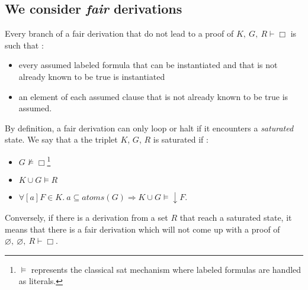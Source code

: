 \documentclass[a4paper,10pt]{report}
\newcommand{\atoms}{\mathit{atoms}}
\newcommand{\gen}{\vdash}
\begin{document}
\subsection{We consider \emph{fair} derivations}
Every branch of a fair derivation that do not lead to a proof of $K,\ G,\ R\gen\Box$ is such that :
\begin{itemize}
 \item every assumed labeled formula that can be instantiated and that is
not already known to be true is instantiated
 \item an element of each assumed clause that is not already known to be true is assumed.
\end{itemize}
By definition, a fair derivation can only loop or halt if it encounters a \emph{saturated} state.
We say that a the triplet $K$, $G$, $R$ is saturated if :
\begin{itemize}
 \item $G\nvDash\Box$\footnote{$\vDash$ represents the classical sat mechanism where labeled
formulas are handled as literals.}
 \item $K\cup G\vDash R$
 \item $\forall [a]F\in K.\ a\subseteq\atoms(G)\Rightarrow K\cup G\vDash\downarrow F$.
\end{itemize}
Conversely,
if there is a derivation from a set $R$ that reach a saturated state, it means that there
is a fair derivation which will not come up with a proof of $\varnothing,\ \varnothing,\ R\gen\Box$.
\end{document}
